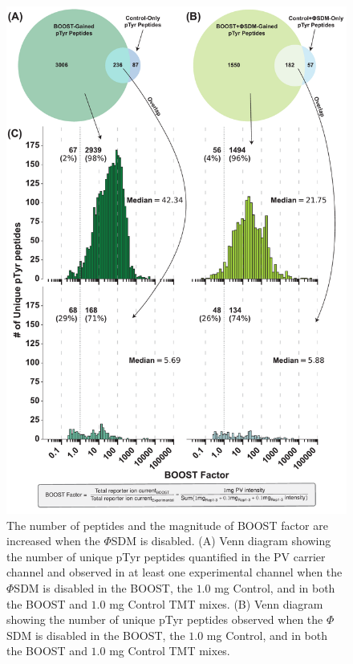 \documentclass[journal=jprobs,manuscript=article]{achemso}
\begin{document}
\begin{figure}
\centering
\includegraphics[width=135mm]{figures/main_figs/boost_factor.pdf}
\caption{The number of peptides and the magnitude of BOOST factor are increased when the $\Phi$SDM is disabled. (A) Venn diagram showing the number of unique pTyr peptides quantified in the PV carrier channel and observed in at least one experimental channel when the $\Phi$SDM is disabled  in the BOOST, the $1.0$ mg Control, and in both the BOOST and $1.0$ mg Control TMT mixes. (B) Venn diagram showing the number of unique pTyr peptides observed when the $\Phi$SDM is disabled  in the BOOST, the $1.0$ mg Control, and in both the BOOST and $1.0$ mg Control TMT mixes. }\label{boost_factor}
\end{figure}
\end{document}
